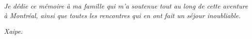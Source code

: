 
\begin{flushright}
	\itshape
	Je dédie ce mémoire à ma famille qui m'a soutenue tout au long de cette aventure à Montréal, ainsi que toutes les rencontres qui en ont fait un séjour inoubliable.
\end{flushright}

\vfill

\begin{flushright}
	\textit{Xaipe}.
\end{flushright}
